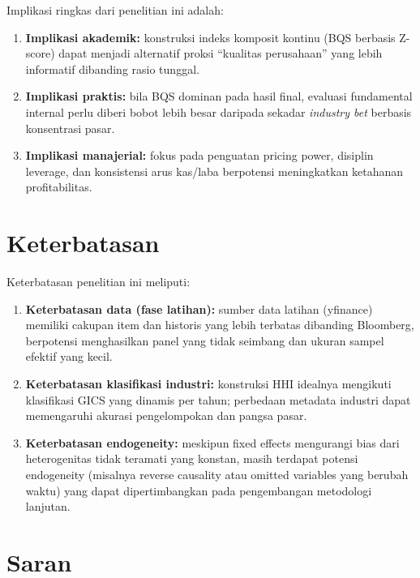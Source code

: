 \documentclass[12pt,a4paper]{report}
\providecommand{\tightlist}{%
  \setlength{\itemsep}{0pt}\setlength{\parskip}{0pt}%
}
\begin{document}
Implikasi ringkas dari penelitian ini adalah:

\begin{enumerate}
\def\labelenumi{\arabic{enumi}.}
\tightlist
\item
  \textbf{Implikasi akademik:} konstruksi indeks komposit kontinu (BQS
  berbasis Z-score) dapat menjadi alternatif proksi ``kualitas
  perusahaan'' yang lebih informatif dibanding rasio tunggal.
\item
  \textbf{Implikasi praktis:} bila BQS dominan pada hasil final,
  evaluasi fundamental internal perlu diberi bobot lebih besar daripada
  sekadar \emph{industry bet} berbasis konsentrasi pasar.
\item
  \textbf{Implikasi manajerial:} fokus pada penguatan pricing power,
  disiplin leverage, dan konsistensi arus kas/laba berpotensi
  meningkatkan ketahanan profitabilitas.
\end{enumerate}

\hypertarget{keterbatasan}{%
\section{Keterbatasan}\label{keterbatasan}}

Keterbatasan penelitian ini meliputi:

\begin{enumerate}
\def\labelenumi{\arabic{enumi}.}
\tightlist
\item
  \textbf{Keterbatasan data (fase latihan):} sumber data latihan
  (yfinance) memiliki cakupan item dan historis yang lebih terbatas
  dibanding Bloomberg, berpotensi menghasilkan panel yang tidak seimbang
  dan ukuran sampel efektif yang kecil.
\item
  \textbf{Keterbatasan klasifikasi industri:} konstruksi HHI idealnya
  mengikuti klasifikasi GICS yang dinamis per tahun; perbedaan metadata
  industri dapat memengaruhi akurasi pengelompokan dan pangsa pasar.
\item
  \textbf{Keterbatasan endogeneity:} meskipun fixed effects mengurangi
  bias dari heterogenitas tidak teramati yang konstan, masih terdapat
  potensi endogeneity (misalnya reverse causality atau omitted variables
  yang berubah waktu) yang dapat dipertimbangkan pada pengembangan
  metodologi lanjutan.
\end{enumerate}

\hypertarget{saran}{%
\section{Saran}\label{saran}}
\end{document}
